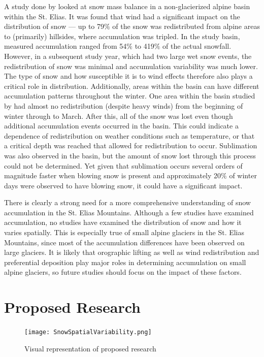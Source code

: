 \documentclass[12pt]{article}
\begin{document}
A study done by \cite{Pomeroy1999} looked at snow mass balance in a non-glacierized alpine basin within the St. Elias. It was found that wind had a significant impact on the distribution of snow --- up to 79$\%$ of the snow was redistributed from alpine areas to (primarily) hillsides, where accumulation was tripled. In the study basin, measured accumulation ranged from 54$\%$ to 419$\%$ of the actual snowfall. However, in a subsequent study year, which had two large wet snow events, the redistribution of snow was minimal and accumulation variability was much lower. The type of snow and how susceptible it is to wind effects therefore also plays a critical role in distribution. Additionally, areas within the basin can have different accumulation patterns throughout the winter. One area within the basin studied by \cite{Pomeroy1999} had almost no redistribution (despite heavy winds) from the beginning of winter through to March. After this, all of the snow was lost even though additional accumulation events occurred in the basin. This could indicate a dependence of redistribution on weather conditions such as temperature, or that a critical depth was reached that allowed for redistribution to occur. Sublimation was also observed in the basin, but the amount of snow lost through this process could not be determined. Yet given that sublimation occurs several orders of magnitude faster when blowing snow is present and approximately 20$\%$ of winter days were observed to have blowing snow, it could have a significant impact.

There is clearly a strong need for a more comprehensive understanding of snow accumulation in the St. Elias Mountains. Although a few studies have examined accumulation, no studies have examined the distribution of snow and how it varies spatially. This is especially true of small alpine glaciers in the St. Elias Mountains, since most of the accumulation differences have been observed on large glaciers. It is likely that orographic lifting as well as wind redistribution and preferential deposition play major roles in determining accumulation on small alpine glaciers, so future studies should focus on the impact of these factors. 

\section{Proposed Research}
 \begin{figure}
           \texttt{[image: SnowSpatialVariability.png]}
       \caption{Visual representation of proposed research}
       \label{flowchart}
\end{figure}
\end{document}

